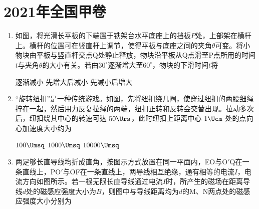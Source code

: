 \documentclass[\gkver]{gaokaozhenti}
\begin{document}
\chapter{2021年全国甲卷}

\begin{enumerate}
\item
如图，将光滑长平板的下端置于铁架台水平底座上的挡板$P$处，上部架在横杆上。横杆的位置可在竖直杆上调节，使得平板与底座之间的夹角$\theta$可变。将小物块由平板与竖直杆交点Q处静止释放，物块沿平板从Q点滑至P点所用的时间$t$与夹角$\theta$的大小有关。若由$30^\circ$逐渐增大至$60^\circ$，物块的下滑时间$t$将


{逐渐减小}
{先增大后减小}
{先减小后增大}


\item
“旋转纽扣”是一种传统游戏。如图，先将纽扣绕几圈，使穿过纽扣的两股细绳拧在一起，然后用力反复拉绳的两端，纽扣正转和反转会交替出现。拉动多次后，纽扣绕其中心的转速可达 $50\Urs$，此时纽扣上距离中心 $1\Ucm$ 处的点向心加速度大小约为


\fourchoices[answer=C]
{$10\Umsq$}
{$100\Umsq$}
{$1000\Umsq$}
{$10000\Umsq$}


\item
两足够长直导线均折成直角，按图示方式放置在同一平面内，EO与O$'$Q在一条直线上，PO$'$与OF在一条直线上，两导线相互绝缘，通有相等的电流$I$，电流方向如图所示。若一根无限长直导线通过电流$I$时，所产生的磁场在距离导线$d$处的磁感应强度大小为$B$，则图中与导线距离均为$d$的M、N两点处的磁感应强度大小分别为


\end{enumerate}
\end{document}
